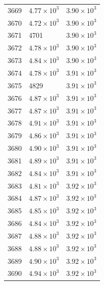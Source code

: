 \begin{table}[H]
\begin{tabular}{lll}
3669 & $\displaystyle 4.77 \times 10^{3}$ & $\displaystyle 3.90 \times 10^{3}$ \\
3670 & $\displaystyle 4.72 \times 10^{3}$ & $\displaystyle 3.90 \times 10^{3}$ \\
3671 & 4701 & $\displaystyle 3.90 \times 10^{3}$ \\
3672 & $\displaystyle 4.78 \times 10^{3}$ & $\displaystyle 3.90 \times 10^{3}$ \\
3673 & $\displaystyle 4.84 \times 10^{3}$ & $\displaystyle 3.90 \times 10^{3}$ \\
3674 & $\displaystyle 4.78 \times 10^{3}$ & $\displaystyle 3.91 \times 10^{3}$ \\
3675 & 4829 & $\displaystyle 3.91 \times 10^{3}$ \\
3676 & $\displaystyle 4.87 \times 10^{3}$ & $\displaystyle 3.91 \times 10^{3}$ \\
3677 & $\displaystyle 4.87 \times 10^{3}$ & $\displaystyle 3.91 \times 10^{3}$ \\
3678 & $\displaystyle 4.91 \times 10^{3}$ & $\displaystyle 3.91 \times 10^{3}$ \\
3679 & $\displaystyle 4.86 \times 10^{3}$ & $\displaystyle 3.91 \times 10^{3}$ \\
3680 & $\displaystyle 4.90 \times 10^{3}$ & $\displaystyle 3.91 \times 10^{3}$ \\
3681 & $\displaystyle 4.89 \times 10^{3}$ & $\displaystyle 3.91 \times 10^{3}$ \\
3682 & $\displaystyle 4.84 \times 10^{3}$ & $\displaystyle 3.91 \times 10^{3}$ \\
3683 & $\displaystyle 4.81 \times 10^{3}$ & $\displaystyle 3.92 \times 10^{3}$ \\
3684 & $\displaystyle 4.87 \times 10^{3}$ & $\displaystyle 3.92 \times 10^{3}$ \\
3685 & $\displaystyle 4.85 \times 10^{3}$ & $\displaystyle 3.92 \times 10^{3}$ \\
3686 & $\displaystyle 4.84 \times 10^{3}$ & $\displaystyle 3.92 \times 10^{3}$ \\
3687 & $\displaystyle 4.88 \times 10^{3}$ & $\displaystyle 3.92 \times 10^{3}$ \\
3688 & $\displaystyle 4.88 \times 10^{3}$ & $\displaystyle 3.92 \times 10^{3}$ \\
3689 & $\displaystyle 4.90 \times 10^{3}$ & $\displaystyle 3.92 \times 10^{3}$ \\
3690 & $\displaystyle 4.94 \times 10^{3}$ & $\displaystyle 3.92 \times 10^{3}$ \\

\end{tabular}
\end{table}
